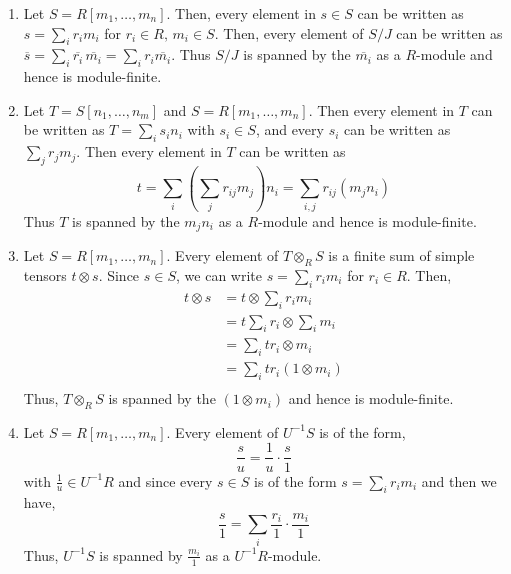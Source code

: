 \documentclass[Notebook.tex]{subfiles}
\begin{document}
\begin{solution}
    \bbni
    \begin{enumerate}
        \item Let $S = R[m_1, \ldots, m_n]$. Then, every element in $s \in S$ can be written as $s = \sum_i r_i m_i$ for $r_i \in R, \, m_i \in S$. Then, every element of $S/J$ can be written as $\overline{s} = \sum_i \overline{r_i} \, \overline{m_i} = \sum_i r_i \overline{m_i}$. Thus $S/J$ is spanned by the $\overline{m_i}$ as a $R$-module and hence is module-finite. 
        
        \item Let $T = S[n_1, \ldots, n_m]$ and $S = R[m_1, \ldots, m_n]$. Then every element in $T$ can be written as $T = \sum_i s_i n_i$ with $s_i \in S$, and every $s_i$ can be written as $\sum_j r_jm_j$. Then every element in $T$ can be written as 
        \[t = \sum_i \left (\sum_j r_{ij} m_j \right ) n_i  = \sum_{i, j} r_{ij} (m_j n_i)\]
        Thus $T$ is spanned by the $m_jn_i$ as a $R$-module and hence is module-finite. 

        \item Let $S = R[m_1, \ldots, m_n]$. Every element of $T \otimes_R S$ is a finite sum of simple tensors $t \otimes s$. Since $s \in S$, we can write $s = \sum_i r_i m_i$ for $r_i \in R$. Then, 
        \begin{align*}
            t \otimes s &= t \otimes \sum_i r_im_i \\ 
            &= t \sum_i r_i \otimes \sum_i m_i \\ 
            &= \sum_i tr_i \otimes m_i \\ 
            &= \sum_i tr_i (1 \otimes m_i) \\ 
        \end{align*}
        Thus, $T \otimes_R S$ is spanned by the $(1 \otimes m_i)$ and hence is module-finite. 

        \item Let $S = R[m_1, \ldots, m_n]$. Every element of $U^{-1}S$ is of the form, 
        \[\frac{s}{u} = \frac{1}{u} \cdot \frac{s}{1}\]
        with $\frac{1}{u} \in U^{-1}R$ and since every $s \in S$ is of the form $s = \sum_i r_i m_i$ and then we have, 
        \[\frac{s}{1} = \sum_i \frac{r_i}{1} \cdot \frac{m_i}{1}\]
        Thus, $U^{-1}S$ is spanned by $\frac{m_i}{1}$ as a $U^{-1}R$-module. 
    \end{enumerate}
\end{solution}


\newpage 
\end{document}
